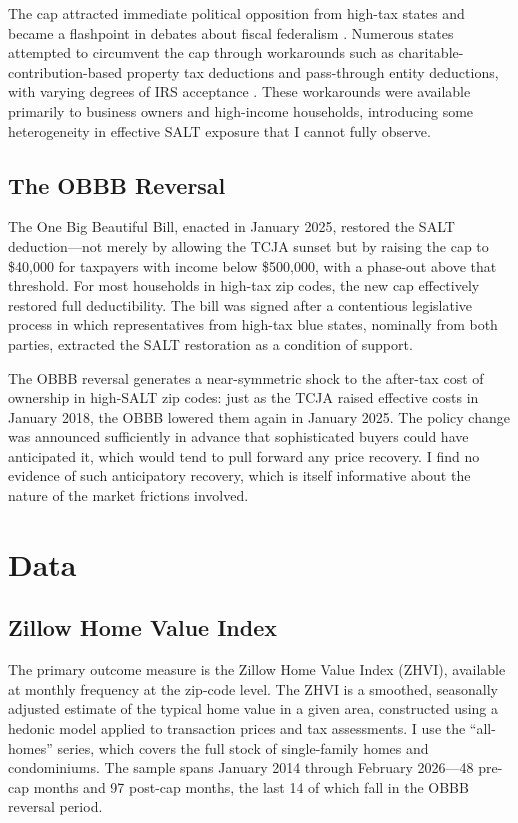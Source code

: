 \documentclass[12pt]{article}
\begin{document}
The cap attracted immediate political opposition from high-tax states and became a flashpoint in debates about fiscal federalism \citep{FattaliBrunori2020, KlimekWallace2022}. Numerous states attempted to circumvent the cap through workarounds such as charitable-contribution-based property tax deductions and pass-through entity deductions, with varying degrees of IRS acceptance \citep{Kamin2019, Auerbach2020}. These workarounds were available primarily to business owners and high-income households, introducing some heterogeneity in effective SALT exposure that I cannot fully observe.

\subsection{The OBBB Reversal}

The One Big Beautiful Bill, enacted in January 2025, restored the SALT deduction---not merely by allowing the TCJA sunset but by raising the cap to \$40,000 for taxpayers with income below \$500,000, with a phase-out above that threshold. For most households in high-tax zip codes, the new cap effectively restored full deductibility. The bill was signed after a contentious legislative process in which representatives from high-tax blue states, nominally from both parties, extracted the SALT restoration as a condition of support.

The OBBB reversal generates a near-symmetric shock to the after-tax cost of ownership in high-SALT zip codes: just as the TCJA raised effective costs in January 2018, the OBBB lowered them again in January 2025. The policy change was announced sufficiently in advance that sophisticated buyers could have anticipated it, which would tend to pull forward any price recovery. I find no evidence of such anticipatory recovery, which is itself informative about the nature of the market frictions involved.

\section{Data}

\subsection{Zillow Home Value Index}

The primary outcome measure is the Zillow Home Value Index (ZHVI), available at monthly frequency at the zip-code level. The ZHVI is a smoothed, seasonally adjusted estimate of the typical home value in a given area, constructed using a hedonic model applied to transaction prices and tax assessments. I use the ``all-homes'' series, which covers the full stock of single-family homes and condominiums. The sample spans January 2014 through February 2026---48 pre-cap months and 97 post-cap months, the last 14 of which fall in the OBBB reversal period.
\end{document}
